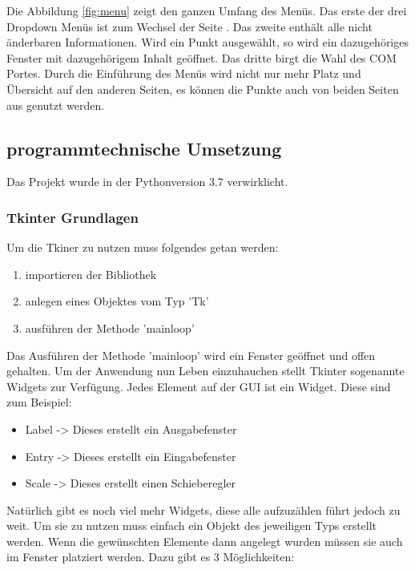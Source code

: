 \documentclass[11pt]{scrartcl}
\begin{document}
\begin{onehalfspace}
Die Abbildung \ref{fig:menu} zeigt den ganzen Umfang des Menüs. Das erste der drei Dropdown Menüs ist zum Wechsel der Seite . Das zweite enthält alle nicht änderbaren Informationen. Wird ein Punkt ausgewählt, so wird ein dazugehöriges Fenster mit dazugehörigem Inhalt geöffnet. Das dritte birgt die Wahl des COM Portes. Durch die Einführung des Menüs wird nicht nur mehr Platz und Übersicht auf den anderen Seiten, es können die Punkte auch von beiden Seiten aus genutzt werden.

\subsection{programmtechnische Umsetzung }
Das Projekt wurde in der Pythonversion 3.7 verwirklicht.

\subsubsection{Tkinter Grundlagen}

Um die Tkiner zu nutzen muss folgendes getan werden:
\begin{enumerate}
\item importieren der Bibliothek
\item anlegen eines Objektes vom Typ 'Tk'
\item ausführen der Methode 'mainloop'
\end{enumerate}

Das Ausführen der Methode 'mainloop' wird ein Fenster geöffnet und offen gehalten. Um der Anwendung nun Leben einzuhauchen stellt Tkinter sogenannte Widgets zur Verfügung. Jedes Element auf der GUI ist ein Widget. Diese sind zum Beispiel:


\begin{itemize}
\item Label -> Dieses erstellt ein Ausgabefenster
\item Entry -> Dieses erstellt ein Eingabefenster 
\item Scale -> Dieses erstellt einen Schieberegler

\end{itemize}

Natürlich gibt es noch viel mehr Widgets, diese alle aufzuzählen führt jedoch zu weit. Um sie zu nutzen muss einfach ein Objekt des jeweiligen Typs erstellt werden. Wenn die gewünschten Elemente dann angelegt wurden müssen sie auch im Fenster platziert werden. Dazu gibt es 3 Möglichkeiten:


\end{onehalfspace}
\end{document}
